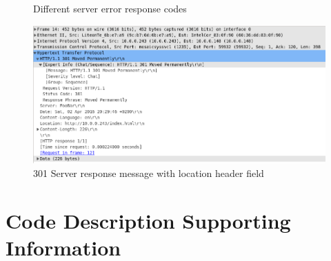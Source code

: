 \documentclass[10pt,twocolumn]{witseiepaper}
\begin{document}
		\begin{figure}[h!]
			\centering
			 \\
			 \\
			 \\
			 \\
			\caption{Different server error response codes}
			\label{fig:server_error}
		\end{figure}
		
		\begin{figure}[h!]
			\centering
			\includegraphics[width=\columnwidth]{resources/301_response_message}
			\caption{301 Server response message with location header field}
			\label{fig:301}
		\end{figure}
\clearpage
\section{Code Description Supporting Information}
	
\end{document}
